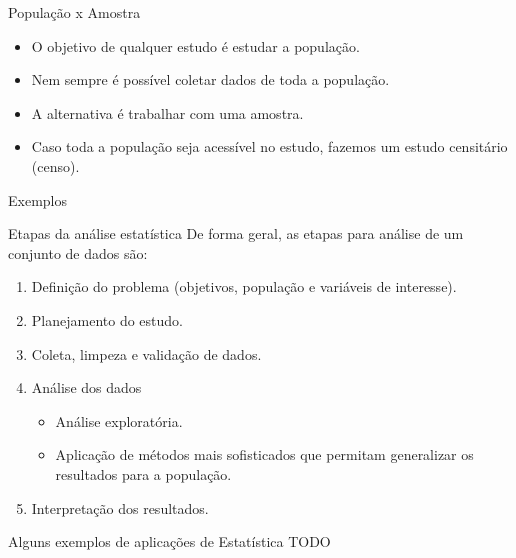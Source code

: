 \documentclass[
  ignorenonframetext,
  serif,
  professionalfont,
  usenames,
  dvipsnames,
  aspectratio = 169]{beamer}
\providecommand{\tightlist}{%
  \setlength{\itemsep}{0pt}\setlength{\parskip}{0pt}}
\renewcommand{\tightlist}{%
  \setlength{\itemsep}{0\baselineskip}
  \setlength{\parskip}{0.25\baselineskip}
}
\begin{document}
\begin{frame}{População x Amostra}
\protect\hypertarget{populauxe7uxe3o-x-amostra}{}
\begin{itemize}
\item
  O objetivo de qualquer estudo é estudar a população.
\item
  Nem sempre é possível coletar dados de toda a população.
\item
  A alternativa é trabalhar com uma amostra.
\item
  Caso toda a população seja acessível no estudo, fazemos um estudo
  censitário (censo).
\end{itemize}
\end{frame}

\begin{frame}{Exemplos}
\protect\hypertarget{exemplos}{}
\end{frame}

\begin{frame}{Etapas da análise estatística}
\protect\hypertarget{etapas-da-anuxe1lise-estatuxedstica}{}
De forma geral, as etapas para análise de um conjunto de dados são:

\begin{enumerate}
\tightlist
\item
  Definição do problema (objetivos, população e variáveis de interesse).
\item
  Planejamento do estudo.
\item
  Coleta, limpeza e validação de dados.
\item
  Análise dos dados

  \begin{itemize}
  \tightlist
  \item
    Análise exploratória.
  \item
    Aplicação de métodos mais sofisticados que permitam generalizar os
    resultados para a população.
  \end{itemize}
\item
  Interpretação dos resultados.
\end{enumerate}
\end{frame}

\begin{frame}{Alguns exemplos de aplicações de Estatística}
\protect\hypertarget{alguns-exemplos-de-aplicauxe7uxf5es-de-estatuxedstica}{}
TODO
\end{frame}
\end{document}
